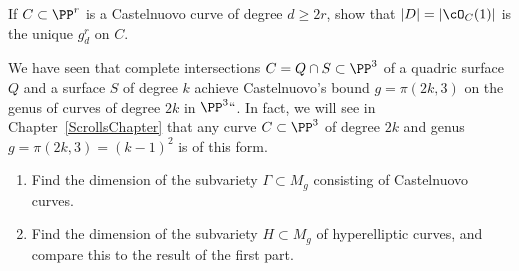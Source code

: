 \begin{exercise}\label{castelnuovo unique}
If $C \subset \PP^r$ is a
Castelnuovo curve
%
of degree $d \geq 2r$,
show that $|D| = |\cO_C(1)|$ is the unique $g^r_d$ on $C$.
\end{exercise}

\begin{exercise}\label{rarity of Castelnuovo}
We have seen that complete intersections $C = Q \cap S \subset \PP^3$ of a
quadric surface $Q$ and a surface $S$ of degree $k$ achieve Castelnuovo's
bound $g = \pi(2k, 3)$ on the genus of curves of degree $2k$ in $\PP^3``$.
In fact, we will see in Chapter~\ref{ScrollsChapter} that any curve
$C \subset \PP^3$ of degree $2k$ and genus $g = \pi(2k, 3) = (k-1)^2$
is of this form.
\begin{enumerate}
\item Find the dimension of the subvariety $\Gamma \subset M_g$ consisting
of Castelnuovo curves.
\item Find the dimension of the subvariety $H \subset M_g$ of
hyperelliptic curves, and compare this to the result of the first part.
\end{enumerate}
\end{exercise}

